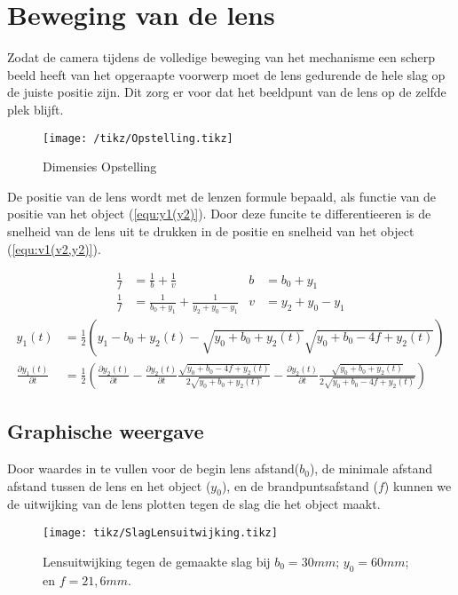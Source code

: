 \section{Beweging van de lens}
Zodat de camera tijdens de volledige beweging van het mechanisme een scherp beeld heeft van het opgeraapte voorwerp moet de lens gedurende de hele slag op de juiste positie zijn. Dit zorg er voor dat het beeldpunt van de lens op de zelfde plek blijft. 
\begin{figure}[h]
\centering
\texttt{[image: /tikz/Opstelling.tikz]}
\caption{Dimensies Opstelling}
\label{fig:Opstelling}
\end{figure}

De positie van de lens wordt met de lenzen formule bepaald, als functie van de positie van het object (\ref{equ:y1(y2)}). Door deze funcite te differentieeren is de snelheid van de lens uit te drukken in de positie en snelheid van het object (\ref{equ:v1(v2,y2)}). 

\begin{align*}
\frac{1}{f}&=\frac{1}{b}+\frac{1}{v}	&	b&=b_{0}+y_{1} \\
\frac{1}{f}&= \frac{1}{b_{0}+y_{1}}+\frac{1}{y_{2}+y_{0}-y_{1}} 	&	v&=y_{2}+y_{0}-y_{1}
\end{align*}
\begin{align}
y_1(t)&=\frac{1}{2}
\left( y_{1}-{b_0} + y_{2}(t) -\sqrt{y_0+b_0+y_2(t)}\sqrt{y_0+b_0-4f+y_2(t)} \right) \label{equ:y1(y2)}\\
\frac{\partial y_1(t)}{\partial t}&=
\frac{1}{2} \left( \frac{\partial y_2(t)}{\partial t} -
\frac{\partial y_2(t)}{\partial t}\frac{\sqrt{y_0+b_0-4f+y_2(t)}}{2\sqrt{y_0+b_0+y_2(t)}} -
\frac{\partial y_2(t)}{\partial t}\frac{\sqrt{y_0+b_0+y_2(t)}}{2\sqrt{y_0+b_0-4f+y_2(t)}} \right) \label{equ:v1(v2,y2)}
\end{align}

\subsection{Graphische weergave}
Door waardes in te vullen voor de begin lens afstand($b_0$), de minimale afstand afstand tussen de lens en het object ($y_0$), en de brandpuntsafstand ($f$) kunnen we de uitwijking van de lens plotten tegen de slag die het object maakt.

\begin{figure}
\centering
	\setlength\figureheight{5cm} 
	\setlength{}
\texttt{[image: tikz/SlagLensuitwijking.tikz]}
\caption[Lensuitwijking tegen de gemaakte slag]{Lensuitwijking tegen de gemaakte slag bij $b_0 = 30mm$; $y_0=60mm$; en $f=21,6mm$.}
\label{fig:SlagLensuitwijking}
\end{figure}

